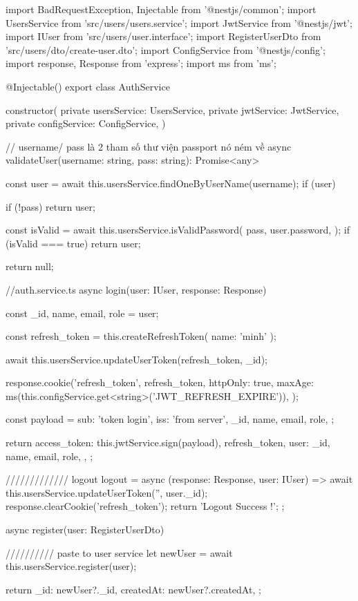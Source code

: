 import { BadRequestException, Injectable } from '@nestjs/common';
import { UsersService } from 'src/users/users.service';
import { JwtService } from '@nestjs/jwt';
import { IUser } from 'src/users/user.interface';
import { RegisterUserDto } from 'src/users/dto/create-user.dto';
import { ConfigService } from '@nestjs/config';
import { response, Response } from 'express';
import ms from 'ms';

@Injectable()
export class AuthService {
  constructor(
    private usersService: UsersService,
    private jwtService: JwtService,
    private configService: ConfigService,
  ) {}

  // username/ pass là 2 tham số thư viện passport nó ném về
  async validateUser(username: string, pass: string): Promise<any> {
    const user = await this.usersService.findOneByUserName(username);
    if (user) {
      if (!pass) {
        return user;
      }

      const isValid = await this.usersService.isValidPassword(
        pass,
        user.password,
      );
      if (isValid === true) {
        return user;
      }
    }
    return null;
  }

  //auth.service.ts
  async login(user: IUser, response: Response) {
    const { _id, name, email, role } = user;

    const refresh_token = this.createRefreshToken({ name: 'minh' });

    await this.usersService.updateUserToken(refresh_token, _id);

    response.cookie('refresh_token', refresh_token, {
      httpOnly: true,
      maxAge: ms(this.configService.get<string>('JWT_REFRESH_EXPIRE')),
    });

    const payload = {
      sub: 'token login',
      iss: 'from server',
      _id,
      name,
      email,
      role,
    };

    return {
      access_token: this.jwtService.sign(payload),
      refresh_token,
      user: {
        _id,
        name,
        email,
        role,
      },
    };
  }
  ///////////// logout
  logout = async (response: Response, user: IUser) => {
    await this.usersService.updateUserToken('', user._id);
    response.clearCookie('refresh_token');
    return 'Logout Success !';
  };

  async register(user: RegisterUserDto) {
    ////////// paste to user service
    let newUser = await this.usersService.register(user);

    return {
      _id: newUser?._id,
      createdAt: newUser?.createdAt,
    };
  }

}
